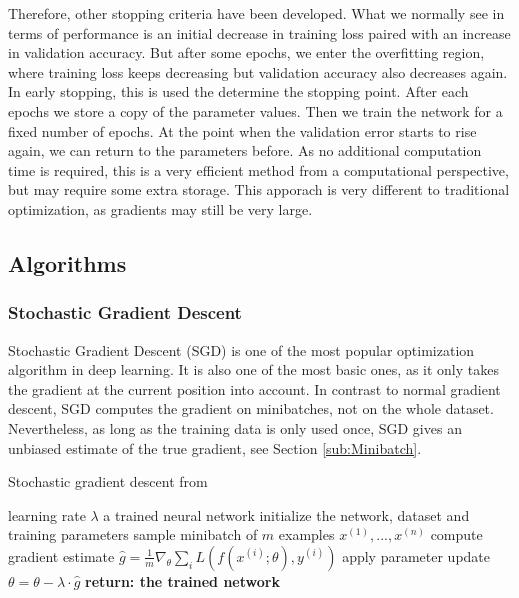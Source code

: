 Therefore, other stopping criteria have been developed. What we normally see in
terms of performance is an initial decrease in training loss paired with an
increase in validation accuracy. But after some epochs, we enter the overfitting
region, where training loss keeps decreasing but validation accuracy also
decreases again. In early stopping, this is used the determine the stopping
point. After each epochs we store a copy of the parameter values. Then we train
the network for a fixed number of epochs. At the point when the validation error
starts to rise again, we can return to the parameters before. As no additional
computation time is required, this is a very efficient method from a
computational perspective, but may require some extra storage. This apporach is
very different to traditional optimization, as gradients may still be very large.



\subsection{Algorithms}
\subsubsection{Stochastic Gradient Descent}\label{SGD}
Stochastic Gradient Descent (SGD) is one of the most popular optimization
algorithm in deep learning. It is also one of the most basic ones, as it only
takes the gradient at the current position into account. In contrast to normal
gradient descent, SGD computes the gradient on minibatches, not on the whole
dataset. Nevertheless, as long as the training data is only used once, SGD gives
an unbiased estimate of the true gradient, see Section \ref{sub:Minibatch}. 

\begin{algorithm}\label{alg:SGD}
    \begin{algorithmic}[1]
        \caption{Stochastic gradient descent from \cite{Goodfellow-et-al-2016}}
        \REQUIRE learning rate $\lambda$
        \ENSURE a trained neural network
        \STATE initialize the network, dataset and training parameters
            \STATE sample minibatch of $m$ examples ${x^{(1)}, ... ,x^{(n)}}$
            \STATE compute gradient estimate $\hat{g}=\frac{1}{m} \nabla_\theta \sum_i L(f(x^{(i)};\theta),y^{(i)})$
            \STATE apply parameter update $\theta=\theta-\lambda\cdot\hat{g}$
        \ENDWHILE
        \STATE \textbf{return: the trained network}
    \end{algorithmic}
\end{algorithm}


